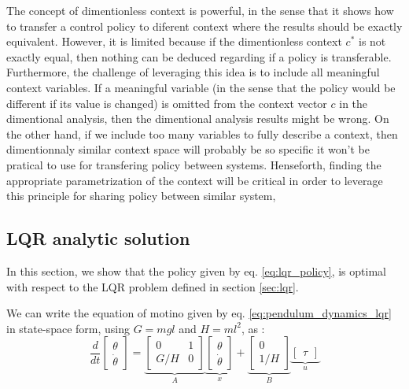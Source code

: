 The concept of dimentionless context is powerful, in the sense that it shows how to transfer a control policy to diferent context where the results should be exactly equivalent. However, it is limited because if the dimentionless context $c^*$ is not exactly equal, then nothing can be deduced regarding if a policy is transferable. Furthermore, the challenge of leveraging this idea is to include all meaningful context variables. If a meaningful variable (in the sense that the policy would be different if its value is changed) is omitted from the context vector $c$ in the dimentional analysis, then the dimentional analysis results might be wrong. On the other hand, if we include too many variables to fully describe a context, then dimentionnaly similar context space will probably be so specific it won't be pratical to use for transfering policy between systems. Henseforth, finding the appropriate parametrization of the context will be critical in order to leverage this principle for sharing policy between similar system, 

\appendix
\subsection{LQR analytic solution}
\label{sec:lqr_proof}
In this section, we show that the policy given by eq. \eqref{eq:lqr_policy}, is optimal with respect to the LQR problem defined in section \ref{sec:lqr}.



We can write the equation of motino given by eq. \eqref{eq:pendulum_dynamics_lqr} in state-space form, using $G=mgl$ and $H=ml^2$, as :
\begin{equation}
\frac{d}{dt} 
\begin{bmatrix}
    \theta \\
    \dot{\theta} 
\end{bmatrix}
= 
\underbrace{
\begin{bmatrix}
    0 & 1 \\
    G/H & 0 
\end{bmatrix}
}_{A}
\underbrace{
\begin{bmatrix}
    \theta \\
    \dot{\theta} 
\end{bmatrix}
}_{x}
+
\underbrace{
\begin{bmatrix}
    0 \\
    1/H
\end{bmatrix}
}_{B}
\underbrace{
\begin{bmatrix}
    \tau
\end{bmatrix}
}_{u}
\end{equation}

